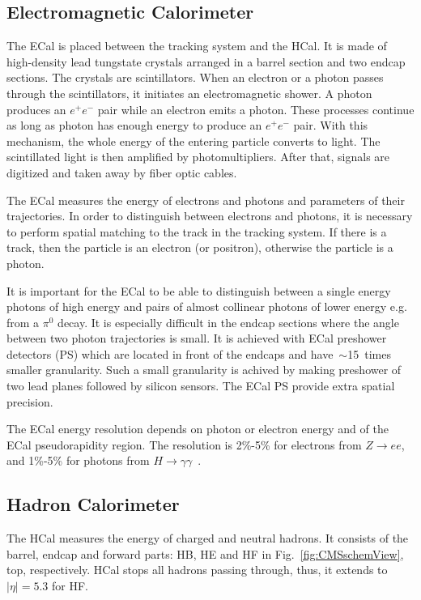 \subsection{Electromagnetic Calorimeter}

The ECal is placed between the tracking system and the HCal. It is made of high-density lead tungstate crystals arranged in a barrel section and two endcap sections. The crystals are scintillators. When an electron or a photon passes through the scintillators, it initiates an electromagnetic shower. A photon produces an $e^+ e^-$ pair while an electron emits a photon. These processes continue as long as photon has enough energy to produce an $e^+ e^-$ pair. With this mechanism, the whole energy of the entering particle converts to light. The scintillated light is then amplified by photomultipliers. After that, signals are digitized and taken away by fiber optic cables.

The ECal measures the energy of electrons and photons and parameters of their trajectories. In order to distinguish between electrons and photons, it is necessary to perform spatial matching to the track in the tracking system. If there is a track, then the particle is an electron (or positron), otherwise the particle is a photon.

It is important for the ECal to be able to distinguish between a single energy photons of high energy and pairs of almost collinear photons of lower energy e.g. from a $\pi^0$ decay. It is especially difficult in the endcap sections where the angle between two photon trajectories is small. It is achieved with ECal preshower detectors (PS) which  are located in front of the endcaps and have~$\sim$15~times smaller granularity. Such a small granularity is achived by making preshower of two lead planes followed by silicon sensors. The ECal PS provide extra spatial precision. 

The ECal energy resolution depends on photon or electron energy and of the ECal pseudorapidity region. The resolution is 2\%-5\% for electrons from $Z\rightarrow ee$, and 1\%-5\% for photons from $H\rightarrow\gamma\gamma$~\cite{ref_ECalResolution}.



\subsection{Hadron Calorimeter}
\label{sec:Exp_CMS_HCal}
The HCal measures the energy of charged and neutral hadrons. It consists of the barrel, endcap and forward parts: HB, HE and HF in Fig.~\ref{fig:CMSschemView}, top, respectively. HCal stops all hadrons passing through, thus, it extends to $|\eta|=5.3$ for HF.

